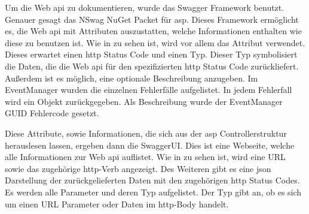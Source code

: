 
Um die Web \gls{api} zu dokumentieren, wurde das Swagger Framework benutzt. Genauer gesagt das NSwag NuGet Packet für \gls{asp}. Dieses Framework ermöglicht es, die Web \gls{api} mit Attributen auszustatten, welche Informationen enthalten wie diese zu benutzen ist. Wie in  zu sehen ist, wird vor allem das \lstcode{[SwaggerResponse]} Attribut verwendet. Dieses erwartet einen \gls{http} Status Code und einen Typ. Dieser Typ symbolisiert die Daten, die die Web \gls{api} für den spezifizierten \gls{http} Status Code zurückliefert. Außerdem ist es möglich, eine optionale Beschreibung anzugeben. Im EventManager wurden die einzelnen Fehlerfälle aufgelistet. In jedem Fehlerfall wird ein  Objekt zurückgegeben. Als Beschreibung wurde der EventManager GUID Fehlercode gesetzt.


Diese Attribute, sowie Informationen, die sich aus der \gls{asp} Controllerstruktur herauslesen lassen, ergeben dann die SwaggerUI. Dies ist eine Webseite, welche alle Informationen zur Web \gls{api} auflistet. Wie in  zu sehen ist, wird eine URL sowie das zugehörige \gls{http}-Verb angezeigt. Des Weiteren gibt es eine \gls{json} Darstellung der zurückgelieferten Daten mit den zugehörigen \gls{http} Status Codes. Es werden alle Parameter und deren Typ aufgelistet. Der Typ gibt an, ob es sich um einen URL Parameter oder Daten im \gls{http}-Body handelt.


